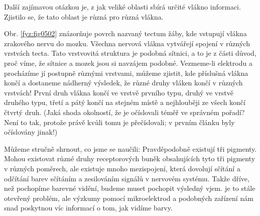     Další zajímavou otázkou je, z jak veliké oblasti sbírá určité vlákno informaci. Zjistilo se, že
    tato oblast je různá pro různá vlákna.
    
    Obr. \ref{fyz:fig0502} znázorňuje povrch nazvaný tectum žáby, kde vstupují vlákna zrakového nervu
    do mozku. Všechna nervová vlákna vytvářejí spojení v různých vrstvách tecta. Tato vrstvovitá
    struktura je podobná sítnici, a to je z části důvod, proč víme, že sítnice a mozek jsou si
    navzájem podobné. Vezmeme-li elektrodu a procházíme jí postupně různými vrstvami, můžeme
    zjistit, kde příslušná vlákna končí a dostaneme nádherný výsledek, že různé druhy vláken končí v
    různých vrstvách! První druh vlákna končí ve vrstvě prvního typu, druhý ve vrstvě druhého typu,
    třetí a pátý končí na stejném místě a nejhlouběji ze všech končí čtvrtý druh. (Jaká shoda
    okolností, že je očíslovali téměř ve správném pořadí? Není to tak, protože právě kvůli tomu je
    přečíslovali; v prvním článku byly očíslovány jinak!)
    
    Můžeme stručně shrnout, co jsme se naučili: Pravděpodobně existují tři pigmenty. Mohou existovat
    různé druhy receptorových buněk obsahujících tyto tři pigmenty v různých poměrech, ale existuje
    mnoho mezispojení, která dovolují sčítání a odčítání barev sčítáním a zesilováním signálů v
    nervovém systému. Takže dříve, než pochopíme barevné vidění, budeme muset pochopit výsledný
    vjem. je to stále otevřený problém, ale výzkumy pomocí mikroelektrod a podobných zařízení nám
    snad poskytnou víc informací o tom, jak vidíme barvy.

